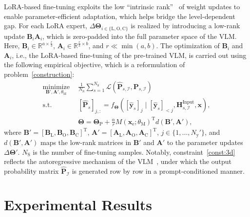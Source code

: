 \documentclass[journal,10pt,twocolumn]{IEEEtran}
\newcommand\IC{\ensuremath{\mathcal{I}}}
\newcommand\LC{\ensuremath{\mathcal{L}}}
\newcommand\PB{\ensuremath{\bm{P}}}
\newcommand\wB{\ensuremath{\bm{w}}}
\newcommand\xB{\ensuremath{\bm{x}}}
\newcommand\yB{\ensuremath{\bm{y}}}
\newcommand\AF{\ensuremath{\mathbf{A}}}
\newcommand\BF{\ensuremath{\mathbf{B}}}
\newcommand\HF{\ensuremath{\mathbf{H}}}
\newcommand\CR{\ensuremath{\mathrm{C}}}
\newcommand\LR{\ensuremath{\mathrm{L}}}
\newcommand\MR{\ensuremath{\mathrm{M}}}
\newcommand\ROR{\ensuremath{\mathrm{O}}}
\newcommand\PR{\ensuremath{\mathrm{P}}}
\newcommand\SR{\ensuremath{\mathrm{S}}}
\newcommand\TR{\ensuremath{\mathrm{T}}}
\newcommand\yR{\ensuremath{\mathrm{y}}}
\newcommand{\wh}{\widehat}
\begin{document}
LoRA-based fine-tuning exploits the low “intrinsic rank”~\cite{hu2022lora} of weight updates to enable parameter-efficient adaptation, which helps bridge the level-dependent gap. For each LoRA expert, $\Delta\mathbf{\Theta}_{i\in \{\LR, \ROR, \CR\}}$ is realized by introducing a low-rank update $\BF_{i}\AF_{i}$, 
which is zero-padded into the full parameter space of the VLM. 
Here, $\BF_{i}\in\mathbb{R}^{a\times \frac{r}{3}}$, $\AF_{i}\in\mathbb{R}^{\frac{r}{3}\times b}$, and $r\ll \min(a,b)$. The optimization of $\BF_{i}$ and $\AF_{i}$, i.e., the LoRA-based fine-tuning of the pre-trained VLM, is carried out using the following empirical objective, 
which is a reformulation of problem~\eqref{construction}:
\begin{subequations}\label{final_construction}
\begin{align}
\underset{\BF',\AF',\theta_{\MR}}{\mathrm{minimize}}~~&
\frac{1}{N_{\SR}}\sum_{s=1}^{N_{\SR}}\LC\!\left(\wh{\PB}_{s,\IC},\PB_{s,\IC}\right) \label{const:3a}\\
\text{s.t.}~~&
[\wh{\PB}_{s}]_{j,:}=f_{\mathbf{\Theta}}\!\left([\wh{\yB}_{s}]_{j}\mid [\wh{\yB}_{s}]_{<j},\HF^{\mathrm{Input}}_{s,\IC},\xB\right), \label{const:3d}\\
&
\mathbf{\Theta}\!=\!\mathbf{\Theta}_{\PR}+\frac{\alpha}{r}M(\xB_{\mathrm{e}};\theta_{\MR})^{\TR}d(\BF',\AF'), \label{const:3r}
\end{align}
\end{subequations} where $\BF'=[\BF_{\LR},\BF_{\ROR},\BF_{\CR}]^{\TR}$, $\AF'=[\AF_{\LR},\AF_{\ROR},\AF_{\CR}]^{\TR}$, $j\in\{1,\ldots,N_{\yR}'\}$, and $d(\BF',\AF')$ maps the low-rank matrices in $\BF'$ and $\AF'$ 
to the parameter updates $\Delta\mathbf{\Theta}'$. $N_{\SR}$ is the number of fine-tuning samples. Notably, constraint~\eqref{const:3d} reflects the autoregressive mechanism of the VLM~\cite{bai2025qwen2}, 
under which the output probability matrix $\wh{\PB}_{\IC}$ is generated row by row 
in a prompt-conditioned manner.

\section{Experimental Results}
\label{sec:res}

\end{document}
